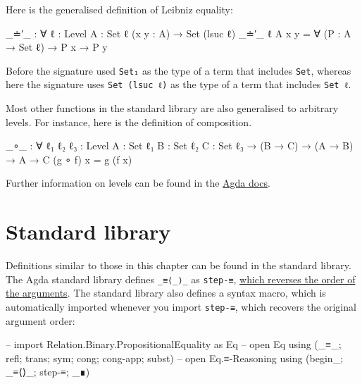 Here is the generalised definition of Leibniz equality:

\begin{fence}
\begin{code}
_≐′_ : ∀ {ℓ : Level} {A : Set ℓ} (x y : A) → Set (lsuc ℓ)
_≐′_ {ℓ} {A} x y = ∀ (P : A → Set ℓ) → P x → P y
\end{code}
\end{fence}

Before the signature used \texttt{Set₁} as the type of a term that
includes \texttt{Set}, whereas here the signature uses
\texttt{Set\ (lsuc\ ℓ)} as the type of a term that includes
\texttt{Set\ ℓ}.

Most other functions in the standard library are also generalised to
arbitrary levels. For instance, here is the definition of composition.

\begin{fence}
\begin{code}
_∘_ : ∀ {ℓ₁ ℓ₂ ℓ₃ : Level} {A : Set ℓ₁} {B : Set ℓ₂} {C : Set ℓ₃}
  → (B → C) → (A → B) → A → C
(g ∘ f) x  =  g (f x)
\end{code}
\end{fence}

Further information on levels can be found in the
\href{https://agda.readthedocs.io/en/v2.6.1/language/universe-levels.html}{Agda
docs}.

\hypertarget{standard-library}{%
\section{Standard library}\label{standard-library}}

Definitions similar to those in this chapter can be found in the
standard library. The Agda standard library defines \texttt{\_≡⟨\_⟩\_}
as \texttt{step-≡},
\href{https://github.com/agda/agda-stdlib/blob/master/CHANGELOG/v1.3.md\#changes-to-how-equational-reasoning-is-implemented}{which
reverses the order of the arguments}. The standard library also defines
a syntax macro, which is automatically imported whenever you import
\texttt{step-≡}, which recovers the original argument order:

\begin{fence}
\begin{code}
-- import Relation.Binary.PropositionalEquality as Eq
-- open Eq using (_≡_; refl; trans; sym; cong; cong-app; subst)
-- open Eq.≡-Reasoning using (begin_; _≡⟨⟩_; step-≡; _∎)
\end{code}
\end{fence}

